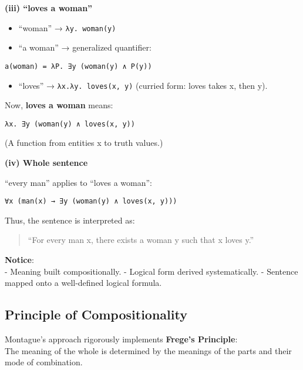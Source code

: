 \documentclass[12pt]{article}
\newcommand{\tightlist}{\itemsep 0pt\parskip 0pt\parsep 0pt}
\begin{document}
\textbf{(iii) ``loves a woman''}

\begin{itemize}
\tightlist
\item
  ``woman'' → \texttt{λy.\ woman(y)}
\item
  ``a woman'' → generalized quantifier:
\end{itemize}

\begin{verbatim}
a(woman) = λP. ∃y (woman(y) ∧ P(y))
\end{verbatim}

\begin{itemize}
\tightlist
\item
  ``loves'' → \texttt{λx.λy.\ loves(x,\ y)} (curried form: loves takes
  x, then y).
\end{itemize}

Now, \textbf{loves a woman} means:

\begin{verbatim}
λx. ∃y (woman(y) ∧ loves(x, y))
\end{verbatim}

(A function from entities x to truth values.)

\textbf{(iv) Whole sentence}

``every man'' applies to ``loves a woman'':

\begin{verbatim}
∀x (man(x) → ∃y (woman(y) ∧ loves(x, y)))
\end{verbatim}

Thus, the sentence is interpreted as:

\begin{quote}
``For every man x, there exists a woman y such that x loves y.''
\end{quote}

\textbf{Notice}:\\
- Meaning built compositionally. - Logical form derived systematically.
- Sentence mapped onto a well-defined logical formula.

\hypertarget{principle-of-compositionality}{%
\subsection{Principle of
Compositionality}\label{principle-of-compositionality}}

Montague's approach rigorously implements \textbf{Frege's Principle}:\\
The meaning of the whole is determined by the meanings of the parts and
their mode of combination.
\end{document}

